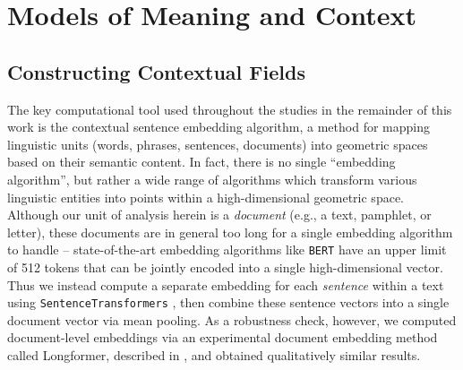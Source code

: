 \documentclass[11pt]{article}
\newcommand{\BERT}[0]{\texttt{BERT}}
\begin{document}
\section{Models of Meaning and Context}\label{sec:meaning-context}

\subsection{Constructing Contextual Fields}\label{sec:contextual-fields}

The key computational tool used throughout the studies in the remainder of this work is the contextual sentence embedding algorithm, a method for mapping linguistic units (words, phrases, sentences, documents) into geometric spaces based on their semantic content. In fact, there is no single ``embedding algorithm'', but rather a wide range of algorithms which transform various linguistic entities into points within a high-dimensional geometric space. Although our unit of analysis herein is a \textit{document} (e.g., a text, pamphlet, or letter), these documents are in general too long for a single embedding algorithm to handle -- state-of-the-art embedding algorithms like \BERT{} have an upper limit of 512 tokens that can be jointly encoded into a single high-dimensional vector. Thus we instead compute a separate embedding for each \textit{sentence} within a text using \texttt{SentenceTransformers} \parencite{reimers_sentencebert_2019}, then combine these sentence vectors into a single document vector via mean pooling. As a robustness check, however, we computed document-level embeddings via an experimental document embedding method called Longformer, described in \cite{beltagy_longformer_2020}, and obtained qualitatively similar results.

\end{document}
